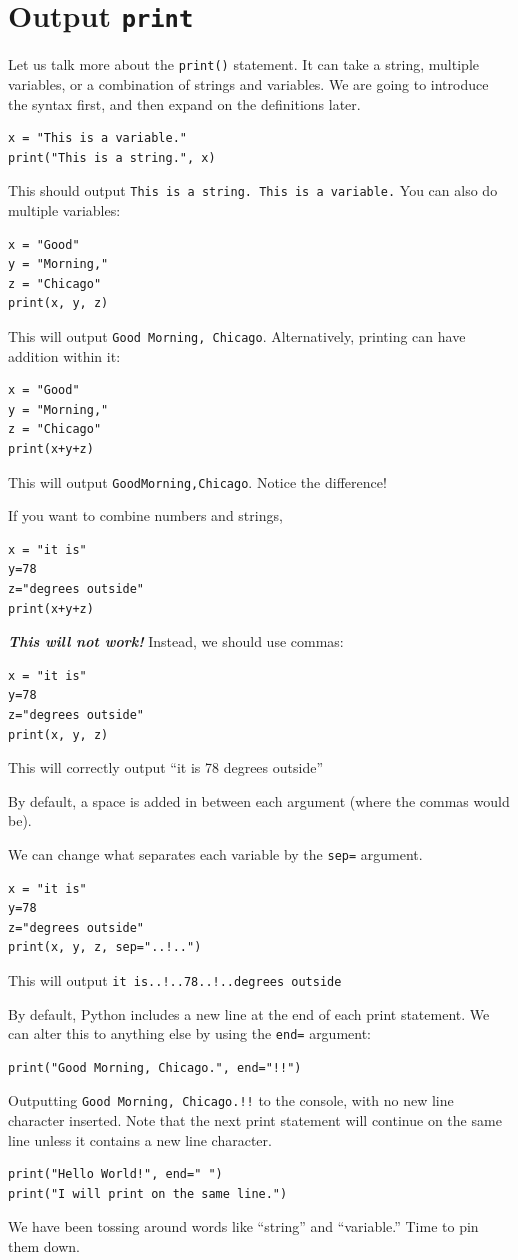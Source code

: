\section{Output \texttt{print}}
Let us talk more about the \texttt{print()} statement. It can take a string, multiple variables, or a combination of strings and variables. We are going to introduce the syntax first, and then expand on the definitions later.

\begin{verbatim}
x = "This is a variable."
print("This is a string.", x)
\end{verbatim}
This should output \texttt{This is a string. This is a variable.} You can also do multiple variables:
\begin{verbatim}
x = "Good"
y = "Morning,"
z = "Chicago"
print(x, y, z)
\end{verbatim}
This will output \texttt{Good Morning, Chicago}. Alternatively, printing can have addition within it:
\begin{verbatim}
x = "Good"
y = "Morning,"
z = "Chicago"
print(x+y+z)
\end{verbatim}
This will output \texttt{GoodMorning,Chicago}. Notice the difference!

If you want to combine numbers and strings,
\begin{verbatim}
x = "it is"
y=78
z="degrees outside"
print(x+y+z)
\end{verbatim}
\textbf{\emph{This will not work!}} Instead, we should use commas:
\begin{verbatim}
x = "it is"
y=78
z="degrees outside"
print(x, y, z)
\end{verbatim}
This will correctly output ``it is 78 degrees outside''

By default, a space is added in between each argument (where the commas would be).

We can change what separates each variable by the \texttt{sep=} argument. 
\begin{verbatim}
x = "it is"
y=78
z="degrees outside"
print(x, y, z, sep="..!..")
\end{verbatim}
This will output \texttt{it is..!..78..!..degrees outside}

By default, Python includes a new line at the end of each print statement. We can alter this to anything else by using the \texttt{end=} argument:
\begin{verbatim}
print("Good Morning, Chicago.", end="!!")
\end{verbatim}
Outputting \texttt{Good Morning, Chicago.!!} to the console, with no new line character inserted. Note that the next print statement will continue on the same line unless it contains a new line character.
\begin{verbatim}
print("Hello World!", end=" ")
print("I will print on the same line.")
\end{verbatim}
We have been tossing around words like ``string'' and ``variable.'' Time to pin them down.
